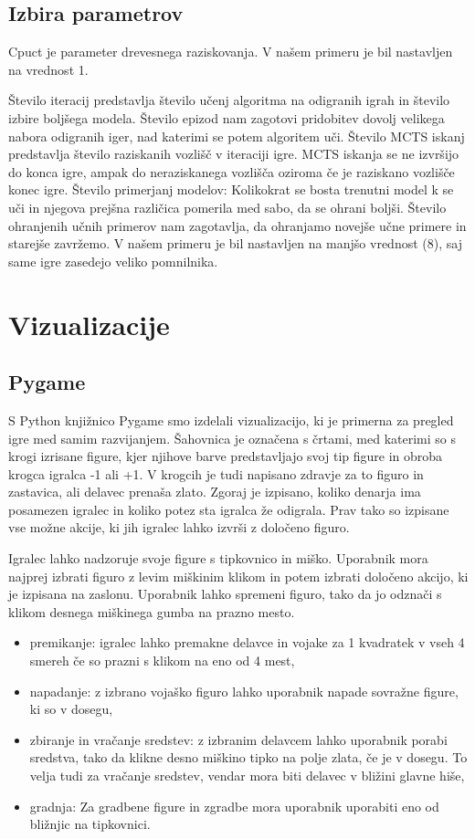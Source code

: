 \documentclass[a4paper, 12pt]{book}
\begin{document}
\section{Izbira parametrov}
Cpuct je parameter drevesnega raziskovanja. V našem primeru je bil nastavljen na vrednost 1.

Število iteracij predstavlja število učenj algoritma na odigranih igrah in število izbire boljšega modela.
Število epizod nam zagotovi pridobitev dovolj velikega nabora odigranih iger, nad katerimi se potem algoritem uči.
Število MCTS iskanj predstavlja število raziskanih vozlišč v iteraciji igre. 
MCTS iskanja se ne izvršijo do konca igre, ampak do neraziskanega vozlišča oziroma če je raziskano vozlišče konec igre.
Število primerjanj modelov: Kolikokrat se bosta trenutni model k se uči in njegova prejšna različica pomerila med sabo, da se ohrani boljši.
Število ohranjenih učnih primerov nam zagotavlja, da ohranjamo novejše učne primere in starejše zavržemo. V našem primeru je bil nastavljen na manjšo vrednost (8), saj same igre zasedejo veliko pomnilnika.

\chapter{Vizualizacije}
\label{chvizualizacija}

\section{Pygame}
S Python knjižnico Pygame smo izdelali vizualizacijo, ki je primerna za pregled igre med samim razvijanjem. Šahovnica je označena s črtami, med katerimi so s krogi izrisane figure, kjer njihove barve predstavljajo svoj tip figure in obroba krogca igralca -1 ali +1.
V krogcih je tudi napisano zdravje za to figuro in zastavica, ali delavec prenaša zlato.
Zgoraj je izpisano, koliko denarja ima posamezen igralec in koliko potez sta igralca že odigrala. Prav tako so izpisane vse možne akcije, ki jih igralec lahko izvrši z določeno figuro.

Igralec lahko nadzoruje svoje figure s tipkovnico in miško.
Uporabnik mora najprej izbrati figuro z levim miškinim klikom in potem izbrati določeno akcijo, ki je izpisana na zaslonu. Uporabnik lahko spremeni figuro, tako da jo odznači s klikom desnega miškinega gumba na prazno mesto.

\begin{itemize}
	\item premikanje: igralec lahko premakne delavce in vojake za 1 kvadratek v vseh 4 smereh če so prazni s klikom na eno od 4 mest,
	\item napadanje: z izbrano vojaško figuro lahko uporabnik napade sovražne figure, ki so v dosegu,
	\item zbiranje in vračanje sredstev: z izbranim delavcem lahko uporabnik porabi sredstva, tako da klikne desno miškino tipko na polje zlata, če je v dosegu. To velja tudi za vračanje sredstev, vendar mora biti delavec v bližini glavne hiše,
	\item gradnja: Za gradbene figure in zgradbe mora uporabnik uporabiti eno od bližnjic na tipkovnici.
\end{itemize}
\end{document}
